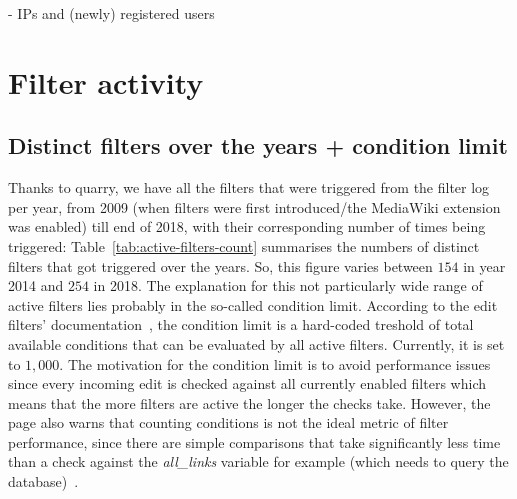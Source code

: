 - IPs and (newly) registered users

\section{Filter activity}
\label{sec:filter-activity}

\subsection{Distinct filters over the years + condition limit}
Thanks to quarry, we have all the filters that were triggered from the filter log per year, %
from 2009 (when filters were first introduced/the MediaWiki extension was enabled) till end of 2018, with their corresponding number of times being triggered:
Table~\ref{tab:active-filters-count} summarises the numbers of distinct filters that got triggered over the years.
So, this figure varies between $154$ in year 2014 and $254$ in 2018.
The explanation for this not particularly wide range of active filters lies probably in the so-called condition limit.
According to the edit filters' documentation~\cite{Wikipedia:EditFilterDocumentation}, the condition limit is a hard-coded treshold of total available conditions that can be evaluated by all active filters.
Currently, it is set to $1,000$.
The motivation for the condition limit is to avoid performance issues since every incoming edit is checked against all currently enabled filters which means that the more filters are active the longer the checks take.
However, the page also warns that counting conditions is not the ideal metric of filter performance, since there are simple comparisons that take significantly less time than a check against the \emph{all\_links} variable for example (which needs to query the database)~\cite{Wikipedia:EditFilterDocumentation}.

